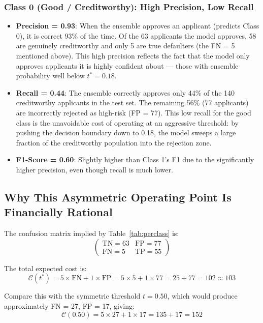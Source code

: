 \documentclass[12pt,a4paper]{article}
\begin{document}
\subsubsection{Class 0 (Good / Creditworthy): High Precision, Low Recall}

\begin{itemize}
    \item \textbf{Precision = 0.93}: When the ensemble approves an applicant
    (predicts Class 0), it is correct 93\% of the time. Of the 63 applicants
    the model approves, 58 are genuinely creditworthy and only 5 are true
    defaulters (the FN = 5 mentioned above). This high precision reflects the
    fact that the model only approves applicants it is highly confident about
    --- those with ensemble probability well below $t^* = 0.18$.

    \item \textbf{Recall = 0.44}: The ensemble correctly approves only 44\% of
    the 140 creditworthy applicants in the test set. The remaining 56\%
    (77 applicants) are incorrectly rejected as high-risk (FP = 77). This low
    recall for the good class is the unavoidable cost of operating at an
    aggressive threshold: by pushing the decision boundary down to 0.18, the
    model sweeps a large fraction of the creditworthy population into the
    rejection zone.

    \item \textbf{F1-Score = 0.60}: Slightly higher than Class 1's F1 due to
    the significantly higher precision, even though recall is much lower.
\end{itemize}

\subsection{Why This Asymmetric Operating Point Is Financially Rational}

The confusion matrix implied by Table~\ref{tab:perclass} is:
\[
\begin{pmatrix}
\text{TN} = 63 & \text{FP} = 77 \\
\text{FN} = 5  & \text{TP} = 55
\end{pmatrix}
\]

The total expected cost is:
\[
\mathcal{C}(t^*) = 5 \times \text{FN} + 1 \times \text{FP}
                 = 5 \times 5 + 1 \times 77 = 25 + 77 = 102 \approx 103
\]

Compare this with the symmetric threshold $t = 0.50$, which would produce
approximately FN = 27, FP = 17, giving:
\[
\mathcal{C}(0.50) = 5 \times 27 + 1 \times 17 = 135 + 17 = 152
\]
\end{document}
